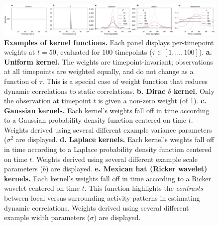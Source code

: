 \documentclass[english]{article}
\begin{document}
\begin{figure}
  \centering
  \includegraphics[width=\textwidth]{figs/kernels}
  \caption{\textbf{Examples of kernel functions.} Each panel
    displays per-timepoint weights at $t = 50$, evaluated for 100
    timepoints ($\tau \in \left[1, ..., 100\right]$).  \textbf{a. Uniform
      kernel.} The weights are timepoint-invariant; observations at
    all timepoints are weighted equally, and do not change as a
    function of $\tau$.  This is a special case of weight function that
    reduces dynamic correlations to static correlations.
    \textbf{b. Dirac $\delta$ kernel.} Only the observation at
    timepoint $t$ is given a non-zero weight (of 1).
    \textbf{c. Gaussian kernels.} Each kernel's weights fall off
    in time according to a Gaussian probability density function
    centered on time $t$.  Weights derived using several different
    example variance parameters ($\sigma^2$ are displayed.
    \textbf{d. Laplace kernels.}  Each kernel's weights fall off
    in time according to a Laplace probability density function
    centered on time $t$.  Weights derived using several different
    example scale parameters ($b$) are displayed.  \textbf{e. Mexican
      hat (Ricker wavelet) kernels.}  Each kernel's weights fall
    off in time according to a Ricker wavelet centered on time $t$.  This
    function highlights the \textit{contrasts} between local versus
    surrounding activity patterns in estimating dynamic
    correlations. Weights derived using several different example
    width parameters ($\sigma$) are displayed.}
  \label{fig:kernels}
\end{figure}
\end{document}
